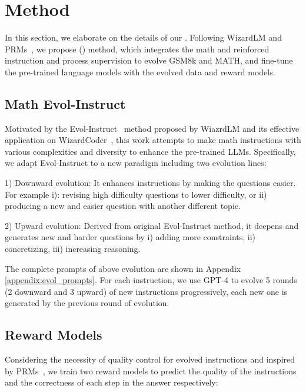 \section{Method}

In this section, we elaborate on the details of our \modelname{}. Following WizardLM and PRMs~\citep{lightman2023openai-verify-step-by-step}, we propose \REInameF{} (\textbf{\REInameS{}}) method, which integrates the math \EIname{} and reinforced instruction and process supervision to evolve GSM8k and MATH, and fine-tune the pre-trained language models with the evolved data and reward models. 

\subsection{Math Evol-Instruct}

Motivated by the Evol-Instruct~\citep{xu2023wizardlm} method proposed by WiazrdLM and its effective application on WizardCoder~\citep{luo2023wizardcoder}, this work attempts to make math instructions with various complexities and diversity to enhance the pre-trained LLMs. Specifically, we adapt Evol-Instruct to a new paradigm including two evolution lines:

1) Downward evolution: It enhances instructions by making the questions easier. For example i): revising high difficulty questions to lower difficulty, or ii) producing a new and easier question with another different topic.

2) Upward evolution:  Derived from original Evol-Instruct method, it deepens and generates new and harder questions by i) adding more constraints, ii) concretizing,  iii) increasing reasoning.

The complete prompts of above evolution are shown in Appendix \ref{appendix:evol_prompts}. For each instruction, we use GPT-4 to evolve 5 rounds (2 downward and 3 upward) of new instructions progressively, each new one is generated by the previous round of evolution.
    

\subsection{Reward Models}\label{section:Reward Models}

Considering the necessity of quality control for evolved instructions  and inspired by PRMs~\citep{lightman2023openai-verify-step-by-step}, we train two reward models to predict the quality of the instructions and  the correctness of each step in the answer respectively:
